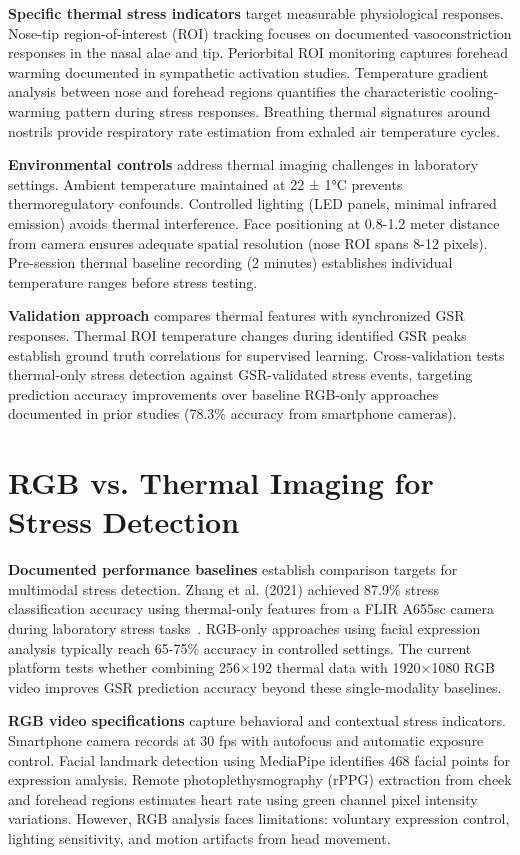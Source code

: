 \textbf{Specific thermal stress indicators} target measurable physiological responses. Nose-tip region-of-interest (ROI) tracking focuses on documented vasoconstriction responses in the nasal alae and tip. Periorbital ROI monitoring captures forehead warming documented in sympathetic activation studies. Temperature gradient analysis between nose and forehead regions quantifies the characteristic cooling-warming pattern during stress responses. Breathing thermal signatures around nostrils provide respiratory rate estimation from exhaled air temperature cycles.

\textbf{Environmental controls} address thermal imaging challenges in laboratory settings. Ambient temperature maintained at 22 ± 1°C prevents thermoregulatory confounds. Controlled lighting (LED panels, minimal infrared emission) avoids thermal interference. Face positioning at 0.8-1.2 meter distance from camera ensures adequate spatial resolution (nose ROI spans 8-12 pixels). Pre-session thermal baseline recording (2 minutes) establishes individual temperature ranges before stress testing.

\textbf{Validation approach} compares thermal features with synchronized GSR responses. Thermal ROI temperature changes during identified GSR peaks establish ground truth correlations for supervised learning. Cross-validation tests thermal-only stress detection against GSR-validated stress events, targeting prediction accuracy improvements over baseline RGB-only approaches documented in prior studies (78.3\% accuracy from smartphone cameras).

\section{RGB vs. Thermal Imaging for Stress Detection}

\textbf{Documented performance baselines} establish comparison targets for multimodal stress detection. Zhang et al. (2021) achieved 87.9\% stress classification accuracy using thermal-only features from a FLIR A655sc camera during laboratory stress tasks~\cite{zhang2021human}. RGB-only approaches using facial expression analysis typically reach 65-75\% accuracy in controlled settings. The current platform tests whether combining 256×192 thermal data with 1920×1080 RGB video improves GSR prediction accuracy beyond these single-modality baselines.

\textbf{RGB video specifications} capture behavioral and contextual stress indicators. Smartphone camera records at 30 fps with autofocus and automatic exposure control. Facial landmark detection using MediaPipe identifies 468 facial points for expression analysis. Remote photoplethysmography (rPPG) extraction from cheek and forehead regions estimates heart rate using green channel pixel intensity variations. However, RGB analysis faces limitations: voluntary expression control, lighting sensitivity, and motion artifacts from head movement.

